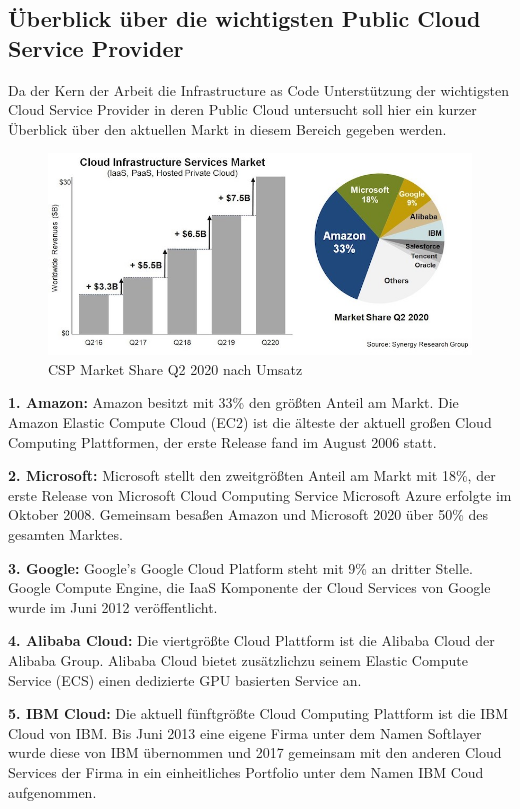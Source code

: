 \subsection{Überblick über die wichtigsten Public Cloud Service Provider}
Da der Kern der Arbeit die Infrastructure as Code Unterstützung der
wichtigsten Cloud Service Provider in deren Public Cloud untersucht soll hier
ein kurzer Überblick über den aktuellen Markt in diesem Bereich gegeben werden.

\begin{figure}[H]
  \includegraphics[width=1.0\textwidth]{fig/hauptteil/CIS_Q220.jpg}
  \caption{CSP Market Share Q2 2020 nach Umsatz}
  \centering
\end{figure}

\textbf{1. Amazon: } Amazon besitzt mit 33\% den größten Anteil am Markt.
Die Amazon Elastic Compute Cloud (EC2) ist die älteste der aktuell großen Cloud
Computing Plattformen, der erste Release fand im August 2006 statt.

\textbf{2. Microsoft: } Microsoft stellt den zweitgrößten Anteil am Markt mit
18\%, der erste Release von Microsoft Cloud Computing Service Microsoft Azure
erfolgte im Oktober 2008. Gemeinsam besaßen Amazon und Microsoft 2020 über 50\%
des gesamten Marktes.

\textbf{3. Google: } Google's Google Cloud Platform steht mit 9\% an dritter
Stelle. Google Compute Engine, die IaaS Komponente der Cloud Services von
Google wurde im Juni 2012 veröffentlicht.

\textbf{4. Alibaba Cloud: } Die viertgrößte Cloud Plattform ist die
Alibaba Cloud der Alibaba Group. Alibaba Cloud bietet zusätzlichzu seinem
Elastic Compute Service (ECS) einen dedizierte GPU basierten Service an. 

\textbf{5. IBM Cloud: } Die aktuell fünftgrößte Cloud Computing Plattform ist
die IBM Cloud von IBM. Bis Juni 2013 eine eigene Firma unter dem Namen Softlayer
wurde diese von IBM übernommen und 2017 gemeinsam mit den anderen Cloud Services
der Firma in ein einheitliches Portfolio unter dem Namen IBM Coud aufgenommen.\\

